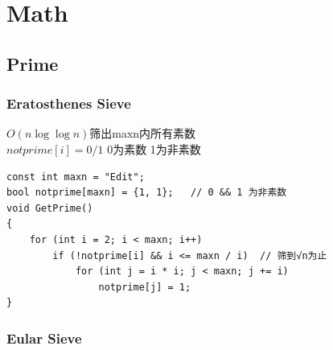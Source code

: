 \documentclass[twoside]{article}
\begin{document}
\section{Math}
\subsection{Prime}
\subsubsection{Eratosthenes Sieve}

$O(n\log\log n)$筛出maxn内所有素数\\
$notprime[i] = 0/1$ 0为素数 1为非素数\\
\begin{lstlisting}
const int maxn = "Edit";
bool notprime[maxn] = {1, 1};   // 0 && 1 为非素数
void GetPrime()
{
    for (int i = 2; i < maxn; i++)
        if (!notprime[i] && i <= maxn / i)  // 筛到√n为止
            for (int j = i * i; j < maxn; j += i)
                notprime[j] = 1;
}
\end{lstlisting}

\subsubsection{Eular Sieve}
\end{document}
